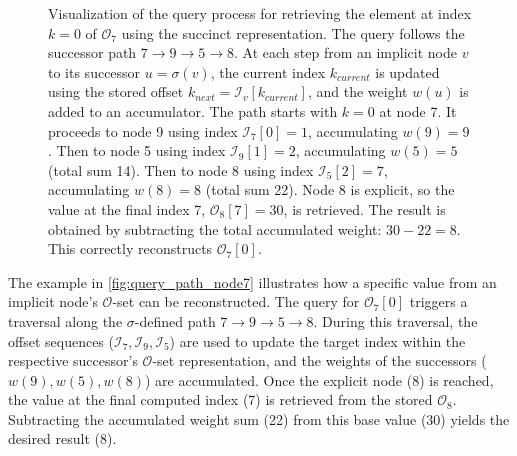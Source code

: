 \begin{figure}[htbp]
    \caption{Visualization of the query process for retrieving the element at index $k=0$ of $\mathcal{O}_7$ using the succinct representation. The query follows the successor path $7 \to 9 \to 5 \to 8$. At each step from an implicit node $v$ to its successor $u=\sigma(v)$, the current index $k_{current}$ is updated using the stored offset $k_{next} = \mathcal{I}_v[k_{current}]$, and the weight $w(u)$ is added to an accumulator. The path starts with $k=0$ at node 7. It proceeds to node 9 using index $\mathcal{I}_7[0]=1$, accumulating $w(9)=9$. Then to node 5 using index $\mathcal{I}_9[1]=2$, accumulating $w(5)=5$ (total sum 14). Then to node 8 using index $\mathcal{I}_5[2]=7$, accumulating $w(8)=8$ (total sum 22). Node 8 is explicit, so the value at the final index 7, $\mathcal{O}_8[7]=30$, is retrieved. The result is obtained by subtracting the total accumulated weight: $30 - 22 = 8$. This correctly reconstructs $\mathcal{O}_7[0]$.}
    \label{fig:query_path_node7} %
\end{figure}

The example in \autoref{fig:query_path_node7} illustrates how a specific value from an implicit node's $\mathcal{O}$-set can be reconstructed. The query for $\mathcal{O}_7[0]$ triggers a traversal along the $\sigma$-defined path $7 \to 9 \to 5 \to 8$. During this traversal, the offset sequences ($\mathcal{I}_7, \mathcal{I}_9, \mathcal{I}_5$) are used to update the target index within the respective successor's $\mathcal{O}$-set representation, and the weights of the successors ($w(9), w(5), w(8)$) are accumulated. Once the explicit node (8) is reached, the value at the final computed index (7) is retrieved from the stored $\mathcal{O}_8$. Subtracting the accumulated weight sum (22) from this base value (30) yields the desired result (8).

